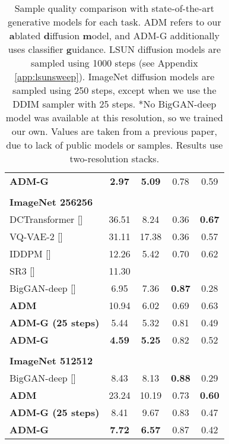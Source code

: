 \documentclass{article}
\newcommand{\shortcite}[1]{[\citenum{#1}]}
\newcommand{\ablaname}{ADM}
\newcommand{\guidedname}{ADM-G}
\begin{document}
\begin{table}[t]
\begin{center}
\begin{small}
\begin{subtable}[t]{.5\linewidth}
\begin{tabular}[t]{lcccc}
    \bf{\guidedname{}}                & \bf{2.97}	 & \bf{5.09}     & 0.78          & 0.59          \\
    \\
    \multicolumn{5}{l}{\bf{ImageNet} 256256} \\
    \toprule
    DCTransformer \shortcite{dctransformer}            & 36.51         & 8.24          & 0.36          & \bf{0.67}  \\
VQ-VAE-2 \shortcite{vqvae2} & 31.11 & 17.38 & 0.36 & 0.57 \\
    IDDPM \shortcite{improved} & 12.26 & 5.42 & 0.70 & 0.62 \\
    SR3 \shortcite{sr3} & 11.30 & & & \\
    BigGAN-deep \shortcite{biggan}              & 6.95          & 7.36          & \bf{0.87}     & 0.28       \\
    \bf{\ablaname{}}                     & 10.94         & 6.02          & 0.69          & 0.63       \\
    \bf{\guidedname{} (25 steps)}      & 5.44	         & 5.32          & 0.81	         & 0.49       \\
    \bf{\guidedname{}}                & \bf{4.59}     & \bf{5.25}     & 0.82          & 0.52       \\
    \\
    \multicolumn{5}{l}{\bf{ImageNet} 512512} \\
    \toprule
    BigGAN-deep \shortcite{biggan}        & 8.43          & 8.13          & \bf{0.88} & 0.29          \\
    \bf{\ablaname{}}                & 23.24         & 10.19         & 0.73      & \bf{0.60}                \\
    \bf{\guidedname{} (25 steps)} & 8.41 &	9.67    & 0.83      & 0.47               \\
    \bf{\guidedname{}}           & \bf{7.72}     & \bf{6.57}     & 0.87      & 0.42               \\
    \end{tabular}
    \end{subtable}
    \end{small}
    \end{center}
    \caption{Sample quality comparison with state-of-the-art generative models for each task. \ablaname{} refers to our \textbf{a}blated \textbf{d}iffusion \textbf{m}odel, and \guidedname{} additionally uses classifier \textbf{g}uidance. LSUN diffusion models are sampled using 1000 steps (see Appendix \ref{app:lsunsweep}). ImageNet diffusion models are sampled using 250 steps, except when we use the DDIM sampler with 25 steps. *No BigGAN-deep model was available at this resolution, so we trained our own. Values are taken from a previous paper, due to lack of public models or samples. Results use two-resolution stacks.}
    \label{tab:sota}
\end{table}
\end{document}
